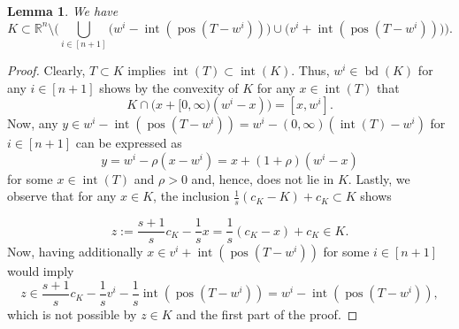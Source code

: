 \documentclass{amsart}
\newtheorem{lemma}[theorem]{Lemma}
\newcommand\R{\mathbb{R}}
\DeclareMathOperator{\pos}{pos}
\DeclareMathOperator{\inte}{int}
\DeclareMathOperator{\bd}{bd}
\begin{document}
\begin{lemma}\label{lem:set_bound1}
We have
\[
	K \subset \R^n \setminus \Bigg( \bigcup_{i \in [n+1]} \big( w^i - \inte(\pos( T - w^i )) \big) \cup \big( v^i + \inte(\pos( T - w^i )) \big) \Bigg).
\]
\end{lemma}
\begin{proof}
Clearly, $T \subset K$ implies $\inte(T) \subset \inte(K)$.
Thus, $w^i \in \bd(K)$ for any $i \in [n+1]$ shows by the convexity of $K$ for any $x \in \inte(T)$ that
\[
	K \cap \big( x + [0,\infty) (w^i - x) \big)
    = [x,w^i].
\]
Now,
any $y \in w^i - \inte(\pos( T - w^i )) = w^i - (0,\infty) (\inte(T) - w^i)$ for $i \in [n+1]$
can be expressed as
\[
	y
    = w^i - \rho (x - w^i)
    = x + (1 + \rho) (w^i - x)
\]
for some $x \in \inte(T)$ and $\rho > 0$ and, hence, does not lie in $K$.
Lastly, we observe that for any $x \in K$, the inclusion $\frac{1}{s} (c_K - K) + c_K \subset K$ shows

\[
	z
    := \frac{s + 1}{s} c_K - \frac{1}{s} x
	= \frac{1}{s} (c_K - x) + c_K
	\in K.
\]
Now, having additionally $x \in v^i + \inte(\pos( T - w^i ))$ for some $i \in [n+1]$ would imply
\[
	z \in \frac{s + 1}{s} c_K - \frac{1}{s} v^i - \frac{1}{s} \inte(\pos( T - w^i ))
		= w^i - \inte(\pos( T - w^i )),
\]
which is not possible by $z \in K$ and the first part of the proof.
\end{proof}
\end{document}
